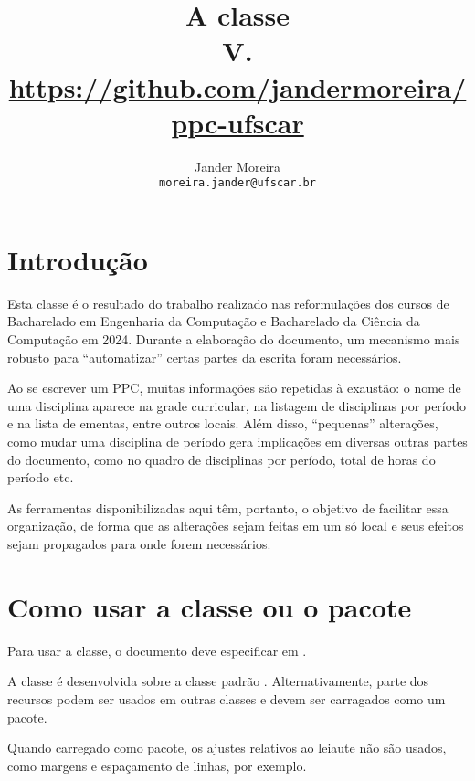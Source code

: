\documentclass[a4paper, 11pt]{article}
\title{
    A classe \PackageName{ppc-ufscar}\\
    \small V.\PPCVersion\\
    \url{https://github.com/jandermoreira/ppc-ufscar}
}
\author{Jander Moreira\\\footnotesize\texttt{moreira.jander@ufscar.br}}
\date{}
\begin{document}
\maketitle

\PDPrintChanges


\section{Introdução}
Esta classe é o resultado do trabalho realizado nas reformulações dos cursos de Bacharelado em Engenharia da Computação e Bacharelado da Ciência da Computação em 2024. Durante a elaboração do documento, um mecanismo mais robusto para ``automatizar'' certas partes da escrita foram necessários.

Ao se escrever um PPC, muitas informações são repetidas à exaustão: o nome de uma disciplina aparece na grade curricular, na listagem de disciplinas por período e na lista de ementas, entre outros locais. Além disso, ``pequenas'' alterações, como mudar uma disciplina de período gera implicações em diversas outras partes do documento, como no quadro de disciplinas por período, total de horas do período etc.

As ferramentas disponibilizadas aqui têm, portanto, o objetivo de facilitar essa organização, de forma que as alterações sejam feitas em um só local e seus efeitos sejam propagados para onde forem necessários.


\section{Como usar a classe ou o pacote}
Para usar a classe, o documento deve especificar  em .


A classe é desenvolvida sobre a classe padrão . Alternativamente, parte dos recursos podem ser usados em outras classes e devem ser carragados como um pacote.


Quando carregado como pacote, os ajustes relativos ao leiaute não são usados, como margens e espaçamento de linhas, por exemplo.
\end{document}
